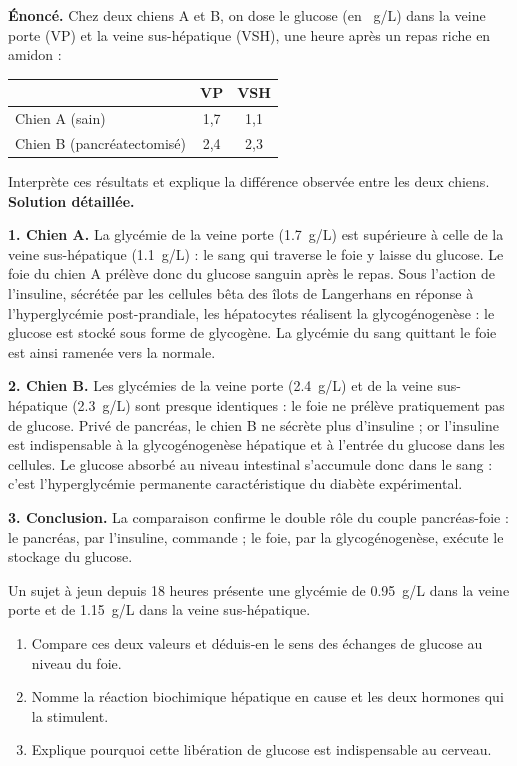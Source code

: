 \documentclass[11pt]{article}
\begin{document}
\begin{exoresolu}
\textbf{Énoncé.} Chez deux chiens A et B, on dose le glucose (en \SI{}{g/L}) dans la veine porte (VP) et la veine sus-hépatique (VSH), une heure après un repas riche en amidon :

\begin{center}
\begin{tabular}{|l|c|c|}
\hline
\rowcolor{popblueL} & VP & VSH \\
\hline
Chien A (sain) & 1,7 & 1,1 \\
\hline
Chien B (pancréatectomisé) & 2,4 & 2,3 \\
\hline
\end{tabular}
\end{center}

Interprète ces résultats et explique la différence observée entre les deux chiens.
\tcblower
\textbf{Solution détaillée.}

\textbf{1. Chien A.} La glycémie de la veine porte (\SI{1,7}{g/L}) est supérieure à celle de la veine sus-hépatique (\SI{1,1}{g/L}) : le sang qui traverse le foie y laisse du glucose. Le foie du chien A prélève donc du glucose sanguin après le repas. Sous l'action de l'insuline, sécrétée par les cellules bêta des îlots de Langerhans en réponse à l'hyperglycémie post-prandiale, les hépatocytes réalisent la glycogénogenèse : le glucose est stocké sous forme de glycogène. La glycémie du sang quittant le foie est ainsi ramenée vers la normale.

\textbf{2. Chien B.} Les glycémies de la veine porte (\SI{2,4}{g/L}) et de la veine sus-hépatique (\SI{2,3}{g/L}) sont presque identiques : le foie ne prélève pratiquement pas de glucose. Privé de pancréas, le chien B ne sécrète plus d'insuline ; or l'insuline est indispensable à la glycogénogenèse hépatique et à l'entrée du glucose dans les cellules. Le glucose absorbé au niveau intestinal s'accumule donc dans le sang : c'est l'hyperglycémie permanente caractéristique du diabète expérimental.

\textbf{3. Conclusion.} La comparaison confirme le double rôle du couple pancréas-foie : le pancréas, par l'insuline, commande ; le foie, par la glycogénogenèse, exécute le stockage du glucose.
\end{exoresolu}

\begin{exercice}
Un sujet à jeun depuis 18 heures présente une glycémie de \SI{0,95}{g/L} dans la veine porte et de \SI{1,15}{g/L} dans la veine sus-hépatique.
\begin{enumerate}
\item Compare ces deux valeurs et déduis-en le sens des échanges de glucose au niveau du foie.
\item Nomme la réaction biochimique hépatique en cause et les deux hormones qui la stimulent.
\item Explique pourquoi cette libération de glucose est indispensable au cerveau.
\end{enumerate}
\end{exercice}
\end{document}

